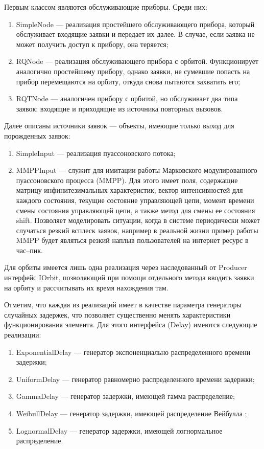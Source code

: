 Первым классом являются обслуживающие приборы. Среди них:
\begin{enumerate}
	\item SimpleNode --- реализация простейшего обслуживающего прибора, который обслуживает входящие заявки и передает их далее. В случае, если заявка не может получить доступ к прибору, она теряется;
	\item RQNode --- реализация обслуживающего прибора с орбитой. Функционирует аналогично простейшему прибору, однако заявки, не сумевшие попасть на прибор перемещаются на орбиту, откуда снова пытаются захватить его;
	\item RQTNode --- аналогичен прибору с орбитой, но обслуживает два типа заявок: входящие и приходящие из источника повторных вызовов.
\end{enumerate}


Далее описаны источники заявок --- объекты, имеющие только выход для порожденных заявок:
\begin{enumerate}
	\item SimpleInput --- реализация пуассоновского потока;
	\item MMPPInput --- служит для имитации работы Марковского модулированного пуассоновского процесса (MMPP). Для этого имеет поля, содержащие матрицу инфинитезимальных характеристик, вектор интенсивностей для каждого состояния, текущие состояние управляющей цепи, момент времени смены состояния управляющей цепи, а также метод для смены ее состояния shift. Позволяет моделировать ситуации, когда в системе периодически может случаться резкий всплеск заявок, например в реальной жизни пример работы MMPP будет являться резкий наплыв пользователей на интернет ресурс в час--пик.
\end{enumerate}

Для орбиты имеется лишь одна реализация через наследованный от Producer интерфейс IOrbit, позволяющий при помощи отдельного метода вводить заявки на орбиту и рассчитывать их время нахождения там.

Отметим, что каждая из реализаций имеет в качестве параметра генераторы случайных задержек, что позволяет существенно менять характеристики функционирования элемента. Для этого интерфейса (Delay) имеются следующие реализации:
\begin{enumerate}
	\item ExponentialDelay --- генератор экспоненциально распределенного времени задержки;
	\item UniformDelay --- генератор равномерно распределенного времени задержки;
	\item GammaDelay --- генератор задержки, имеющей гамма распределение;
 	\item WeibullDelay --- генератор задержки, имеющей распределение Вейбулла \cite{hallinan1993review};
 	\item LognormalDelay --- генератор задержки, имеющей логнормальное распределение.
\end{enumerate}

